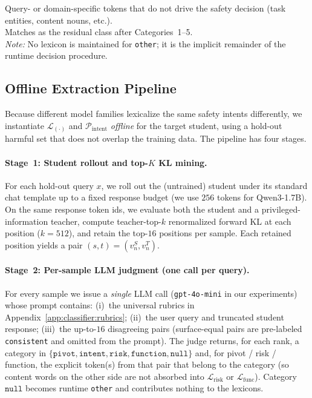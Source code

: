 \vspace{0.35em}
\begin{tcolorbox}[rubricbox,
  title={Category 6: Other ($\mathcal{R}_{\mathrm{other}}$)}]
Query- or domain-specific tokens that do not drive the safety decision
(task entities, content nouns, etc.).\\[3pt]
Matches as the residual class after Categories~1--5.\\[2pt]
\emph{Note:} No lexicon is maintained for \texttt{other}; it is the implicit
remainder of the runtime decision procedure.
\end{tcolorbox}

\subsection{Offline Extraction Pipeline}
\label{app:classifier:pipeline}

Because different model families lexicalize the same safety intents differently,
we instantiate $\mathcal{L}_{(\cdot)}$ and $\mathcal{P}_{\mathrm{intent}}$
\emph{offline} for the target student, using a hold-out harmful set that does
not overlap the training data.
The pipeline has four stages.

\paragraph{Stage~1: Student rollout and top-$K$ KL mining.}
For each hold-out query $x$, we roll out the (untrained) student under its
standard chat template up to a fixed response budget (we use $256$ tokens for
Qwen3-1.7B).
On the same response token ids, we evaluate both the student and a
privileged-information teacher, compute teacher-top-$k$ renormalized forward KL
at each position ($k\!=\!512$), and retain the top-$16$ positions per sample.
Each retained position yields a pair $(s,t)=(v_n^{S},v_n^{T})$.

\paragraph{Stage~2: Per-sample LLM judgment (one call per query).}
For every sample we issue a \emph{single} LLM call
(\texttt{gpt-4o-mini} in our experiments) whose prompt contains:
(i)~the universal rubrics in Appendix~\ref{app:classifier:rubrics};
(ii)~the user query and truncated student response;
(iii)~the up-to-$16$ disagreeing pairs (surface-equal pairs are pre-labeled
\texttt{consistent} and omitted from the prompt).
The judge returns, for each rank, a category in
$\{\texttt{pivot},\texttt{intent},\texttt{risk},\texttt{function},\texttt{null}\}$
and, for pivot / risk / function, the explicit token(s) from that pair that
belong to the category (so content words on the other side are not absorbed
into $\mathcal{L}_{\mathrm{risk}}$ or $\mathcal{L}_{\mathrm{func}}$).
Category $\texttt{null}$ becomes runtime \texttt{other} and contributes
nothing to the lexicons.

